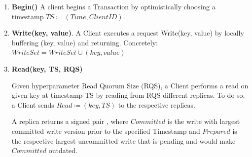\begin{enumerate}
\item \textbf{Begin()} A client begins a Transaction by optimistically choosing a timestamp $TS \coloneqq (Time, Client ID)$. 
\item \textbf{Write(key, value)}. A Client executes a request Write(key, value) by locally buffering (key, value) and returning. Concretely: $WriteSet = WriteSet \cup (key, value)$


\item \textbf{Read(key, TS, RQS)} 


Given hyperparameter Read Quorum Size (RQS), a Client performs a read on given key at timestamp TS by reading from RQS different replicas. To do so, a Client sends $Read \coloneqq (key, TS)$  to the respective replicas.
\\


A replica returns a signed pair  , where $Committed$ is the write with largest committed write version prior to the specified Timestamp and $Prepared$ is the respective largest uncommitted write that is pending and would make $Committed$ outdated. 


\end{enumerate}
